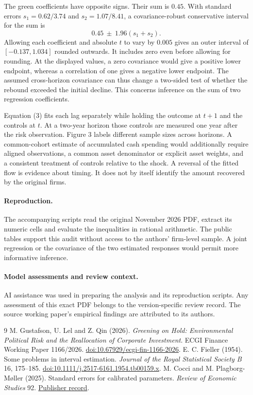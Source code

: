 \documentclass[11pt]{article}
\begin{document}
The green coefficients have opposite signs. Their sum is $0.45$. With standard errors $s_1=0.62/3.74$ and $s_2=1.07/8.41$, a covariance-robust conservative interval for the sum is
\[
 0.45\ \pm\ 1.96(s_1+s_2).
\]
Allowing each coefficient and absolute $t$ to vary by $0.005$ gives an outer interval of $[-0.137,1.034]$ rounded outwards. It includes zero even before allowing for rounding. At the displayed values, a zero covariance would give a positive lower endpoint, whereas a correlation of one gives a negative lower endpoint. The assumed cross-horizon covariance can thus change a two-sided test of whether the rebound exceeded the initial decline. This concerns inference on the sum of two regression coefficients.

Equation (3) fits each lag separately while holding the outcome at $t+1$ and the controls at $t$. At a two-year horizon those controls are measured one year after the risk observation. Figure 3 labels different sample sizes across horizons. A common-cohort estimate of accumulated cash spending would additionally require aligned observations, a common asset denominator or explicit asset weights, and a consistent treatment of controls relative to the shock. A reversal of the fitted flow is evidence about timing. It does not by itself identify the amount recovered by the original firms.

\paragraph{Reproduction.} The accompanying scripts read the original November 2026 PDF, extract its numeric cells and evaluate the inequalities in rational arithmetic. The public tables support this audit without access to the authors' firm-level sample. A joint regression or the covariance of the two estimated responses would permit more informative inference.
\paragraph{Model assessments and review context.} AI assistance was used in preparing the analysis and its reproduction scripts. Any assessment of this exact PDF belongs to the version-specific review record. The source working paper's empirical findings are attributed to its authors.

\begin{thebibliography}{9}
 M. Gustafson, U. Lel and Z. Qin (2026). \emph{Greening on Hold: Environmental Political Risk and the Reallocation of Corporate Investment}. ECGI Finance Working Paper 1166/2026. \href{https://doi.org/10.67929/ecgi-fin-1166-2026}{doi:10.67929/ecgi-fin-1166-2026}.
 E. C. Fieller (1954). Some problems in interval estimation. \emph{Journal of the Royal Statistical Society B} 16, 175--185. \href{https://doi.org/10.1111/j.2517-6161.1954.tb00159.x}{doi:10.1111/j.2517-6161.1954.tb00159.x}.
 M. Cocci and M. Plagborg-M{\o}ller (2025). Standard errors for calibrated parameters. \emph{Review of Economic Studies} 92. \href{https://academic.oup.com/restud/article/92/5/2952/7822151}{Publisher record}.
\end{thebibliography}
\end{document}
